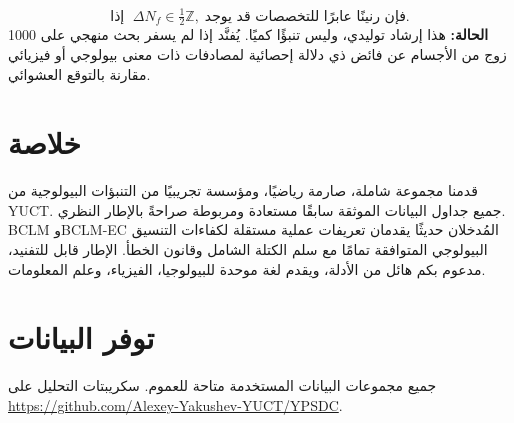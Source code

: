 \documentclass[11pt,a4paper]{article}
\begin{document}
	\begin{equation}\label{eq:pred-hg}
		\text{إذا }\; \Delta N_f \in \tfrac12\mathbb{Z},\;
		\text{فإن رنينًا عابرًا للتخصصات قد يوجد.}
	\end{equation}
	\textbf{الحالة:} هذا إرشاد توليدي، وليس تنبؤًا كميًا. يُفنَّد إذا لم يسفر بحث منهجي على 1000 زوج من الأجسام عن فائض ذي دلالة إحصائية لمصادفات ذات معنى بيولوجي أو فيزيائي مقارنة بالتوقع العشوائي.
	
	\section{خلاصة}
	
	قدمنا مجموعة شاملة، صارمة رياضيًا، ومؤسسة تجريبيًا من التنبؤات البيولوجية من YUCT. جميع جداول البيانات الموثقة سابقًا مستعادة ومربوطة صراحةً بالإطار النظري. BCLM وBCLM-EC المُدخلان حديثًا يقدمان تعريفات عملية مستقلة لكفاءات التنسيق البيولوجي المتوافقة تمامًا مع سلم الكتلة الشامل وقانون الخطأ. الإطار قابل للتفنيد، مدعوم بكم هائل من الأدلة، ويقدم لغة موحدة للبيولوجيا، الفيزياء، وعلم المعلومات.
	
	\section*{توفر البيانات}
	
	جميع مجموعات البيانات المستخدمة متاحة للعموم. سكريبتات التحليل على \url{https://github.com/Alexey-Yakushev-YUCT/YPSDC}.
	
\end{document}
